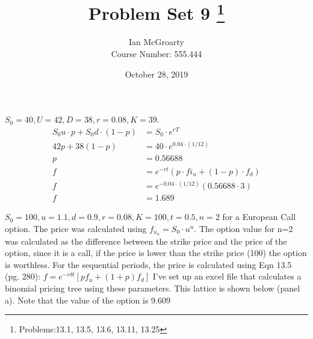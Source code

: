 \documentclass[12pt]{article}
\title{Problem Set 9 \thanks{Problems:13.1, 13.5, 13.6, 13.11, 13.25}}
\author{Ian McGroarty \\
	Course Number: 555.444 \\
}
\date{October 28, 2019}
\newenvironment{problem}[3][Problem]{\begin{trivlist}
\item[\hskip \labelsep {\bfseries #1}\hskip \labelsep {\bfseries #2.}]}{\end{trivlist}}
\begin{document}
\maketitle


\begin{problem}{13.1}. $S_0=40, U=42, D=38, r= 0.08, K= 39. $  %
\begin{align*}
S_0u \cdot p + S_0d\cdot (1-p) &= S_0\cdot e^{rT} \\
42p + 38(1-p) &= 40 \cdot e^{0.04 \cdot (1/12)} \\ 
p &= 0.56688 \\
f &= e^{-rt}(p\cdot fi_u + (1-p)\cdot f_d) \\
f &= e^{-0.04 \cdot (1/12)}(0.56688\cdot 3 ) \\ 
f &= 1.689
\end{align*}

\end{problem}

\newpage
\begin{problem}{13.5}.  $ S_0 = 100, u=1.1, d=0.9, r = 0.08, K=100, t=0.5, n=2$ for a European Call option. The price was calculated using $f_{u_n} = S_0\cdot u^n$. The option value for n=2 was calculated as the difference between the strike price and the price of the option, since it is a call, if the price is lower than the strike price (100) the option is worthless. For the sequential periods, the price is calculated using Eqn 13.5 (pg. 280): $f=e^{-r\delta t}[pf_u + (1+p)f_d]$  I\rq{}ve set up an excel file that calculates a binomial pricing tree using these parameters. This lattice is shown below (panel a). Note that the value of the option is 9.609

\end{problem}
\end{document}
